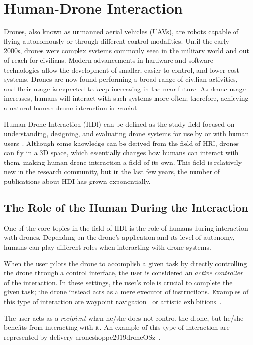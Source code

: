 \section{Human-Drone Interaction}\label{sec:soa_hdi}
Drones, also known as unmanned aerial vehicles (UAVs), are robots capable of flying autonomously or through different control modalities.
Until the early 2000s, drones were complex systems commonly seen in the military world and out of reach for civilians. 
Modern advancements in hardware and software technologies allow the development of smaller, easier-to-control, and lower-cost systems.
Drones are now found performing a broad range of civilian activities, and their usage is expected to keep increasing in the near future.
As drone usage increases, humans will interact with such systems more often; therefore, achieving a natural human-drone interaction is crucial.

Human-Drone Interaction (HDI) can be defined as the study field focused on understanding, designing, and evaluating drone systems 
for use by or with human users~\cite{tezza2019hdi}. Although some knowledge can be derived from the field of HRI, 
drones can fly in a 3D space, which essentially changes how humans can interact with them, making human-drone interaction a field of its own.
This field is relatively new in the research community, but in the last few years, the number of publications about HDI has grown exponentially.

\subsection{The Role of the Human During the Interaction}\label{subsec:hdi_interacction_role}
One of the core topics in the field of HDI is the role of humans during interaction with drones.
Depending on the drone's application and its level of autonomy, humans can play different roles when interacting with drone systems.

When the user pilots the drone to accomplish a given task by directly controlling the drone through a control interface, 
the user is considered an \textit{active controller} of the interaction. In these settings, the user's role is crucial to complete the given task; the drone instead acts as a mere executor of instructions. 
Examples of this type of interaction are waypoint navigation~\cite{hoppe2019droneOS} or artistic exhibitions~\cite{eriksson2020ethicsInMovement}.

The user acts as a \textit{recipient} when he/she does not control the drone, but he/she benefits from interacting with it. An example of this type 
of interaction are represented by delivery droneshoppe2019droneOSz~\cite{singireddy2018primeAir, wingDrones}.

